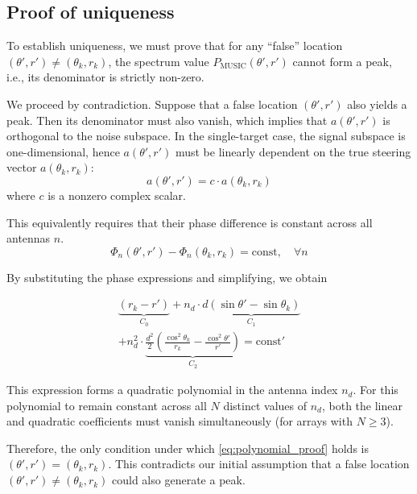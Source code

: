 \documentclass[lettersize,journal]{IEEEtran}
\begin{document}
{\subsection{Proof of uniqueness}

To establish uniqueness, we must prove that for any “false” location $(\theta', r') \neq (\theta_k, r_k)$, the spectrum value $P_{\text{MUSIC}}(\theta', r')$ cannot form a peak, i.e., its denominator is strictly non-zero.

We proceed by contradiction. Suppose that a false location $(\theta', r')$ also yields a peak. Then its denominator must also vanish, which implies that $a(\theta', r')$ is orthogonal to the noise subspace. In the single-target case, the signal subspace is one-dimensional, hence $a(\theta', r')$ must be linearly dependent on the true steering vector $a(\theta_k, r_k)$:
\begin{equation}
	a(\theta', r') = c \cdot a(\theta_k, r_k)
	\label{eq:ambiguity_condition_proof}
\end{equation}
where $c$ is a nonzero complex scalar.

This equivalently requires that their phase difference is constant across all antennas $n$.
\begin{equation}
	\Phi_n(\theta', r') - \Phi_n(\theta_k, r_k) = \text{const}, \quad \forall n
\end{equation}

By substituting the phase expressions and simplifying, we obtain

\begin{multline}
    \underbrace{(r_k - r')}_{C_0} + n_d \cdot \underbrace{d(\sin\theta' - \sin\theta_k)}_{C_1} \\
    + n_d^2 \cdot \underbrace{\frac{d^2}{2}\left(\frac{\cos^2\theta_k}{r_k} - \frac{\cos^2\theta'}{r'}\right)}_{C_2} = \text{const}'
    \label{eq:polynomial_proof}
\end{multline}

This expression forms a quadratic polynomial in the antenna index $n_d$. For this polynomial to remain constant across all $N$ distinct values of $n_d$, both the linear and quadratic coefficients must vanish simultaneously (for arrays with $N \ge 3$).

Therefore, the only condition under which \eqref{eq:polynomial_proof} holds is $(\theta', r') = (\theta_k, r_k)$. This contradicts our initial assumption that a false location $(\theta', r') \neq (\theta_k, r_k)$ could also generate a peak.

}
\end{document}
